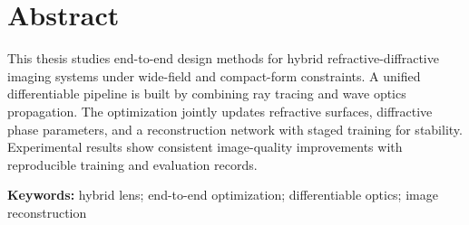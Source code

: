 \chapter*{Abstract}

This thesis studies end-to-end design methods for hybrid refractive-diffractive imaging systems under wide-field and compact-form constraints.
A unified differentiable pipeline is built by combining ray tracing and wave optics propagation.
The optimization jointly updates refractive surfaces, diffractive phase parameters, and a reconstruction network with staged training for stability.
Experimental results show consistent image-quality improvements with reproducible training and evaluation records.

\noindent\textbf{Keywords:} hybrid lens; end-to-end optimization; differentiable optics; image reconstruction
